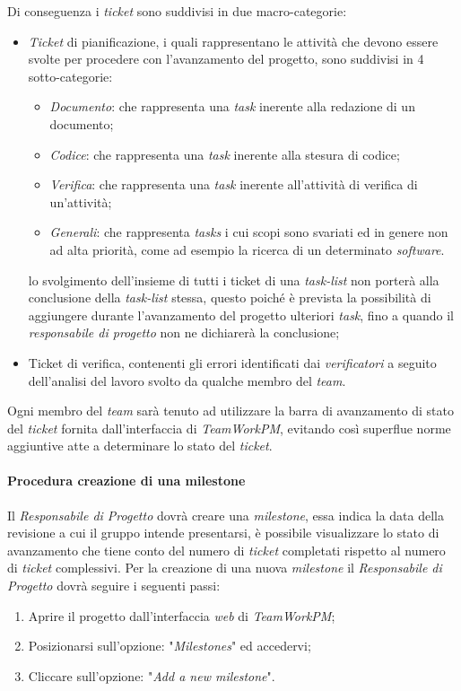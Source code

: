 Di conseguenza i \textit{ticket} sono suddivisi in due macro-categorie:
\begin{itemize}
\item \textit{Ticket} di pianificazione, i quali rappresentano le attività che devono essere svolte per procedere con l'avanzamento del progetto, sono suddivisi in 4 sotto-categorie:
\begin{itemize}
\item \emph{Documento}: che rappresenta una \textit{task} inerente alla redazione di un documento; 
\item \emph{Codice}: che rappresenta una \textit{task} inerente alla stesura di codice;
\item \emph{Verifica}: che rappresenta una \textit{task} inerente all'attività di verifica di un'attività;
\item \emph{Generali}: che rappresenta \textit{tasks} i cui scopi sono svariati ed in genere non ad alta priorità, come ad esempio la ricerca di un determinato \textit{software}.
\end{itemize}
lo svolgimento dell'insieme di tutti i ticket di una \textit{task-list} non porterà alla conclusione della \textit{task-list} stessa, questo poiché è prevista la possibilità di aggiungere durante l'avanzamento del progetto ulteriori \textit{task}, fino a quando il \textit{responsabile di progetto} non ne dichiarerà la conclusione;
\item Ticket di verifica, contenenti gli errori identificati dai \textit{verificatori} a seguito dell'analisi del lavoro svolto da qualche membro del \textit{team}.
\end{itemize}

Ogni membro del \textit{team} sarà tenuto ad utilizzare la barra di avanzamento di stato del \textit{ticket} fornita dall'interfaccia di \textit{TeamWorkPM}, evitando così superflue norme aggiuntive atte a determinare lo stato del \textit{ticket}.

\paragraph{Procedura creazione di una milestone}
Il \textit{Responsabile di Progetto} dovrà creare una \textit{milestone}, essa indica la data della revisione a cui il gruppo \gruppo{} intende presentarsi, è possibile visualizzare lo stato di avanzamento che tiene conto del numero di \textit{ticket} completati rispetto al numero di \textit{ticket} complessivi.
Per la creazione di una nuova \textit{milestone} il \textit{Responsabile di Progetto} dovrà seguire i seguenti passi:
\begin{enumerate}
\item Aprire il progetto dall'interfaccia \textit{web} di \textit{TeamWorkPM};
\item Posizionarsi sull'opzione: "\emph{Milestones}" ed accedervi;
\item Cliccare sull'opzione: "\emph{Add a new milestone}".
\end{enumerate}

